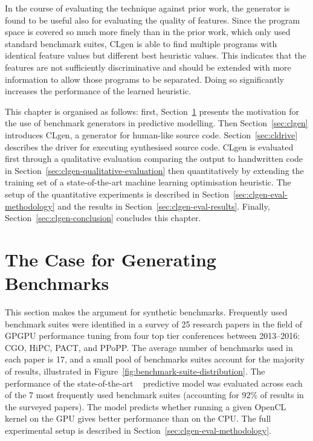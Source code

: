 In the course of evaluating the technique against prior work, the generator is found to be useful also for evaluating the quality of features. Since the program space is covered so much more finely than in the prior work, which only used standard benchmark suites, CLgen is able to find multiple programs with identical feature values but different best heuristic values. This indicates that the features are not sufficiently discriminative and should be extended with more information to allow those programs to be separated. Doing so significantly increases the performance of the learned heuristic.

This chapter is organised as follows: first, Section~\ref{sec:the-case-for-benchmark-generators} presents the motivation for the use of benchmark generators in predictive modelling. Then Section~\ref{sec:clgen} introduces CLgen, a generator for human-like source code. Section~\ref{sec:cldrive} describes the driver for executing synthesised source code. CLgen is evaluated first through a qualitative evaluation comparing the output to handwritten code in Section~\ref{sec:clgen-qualitative-evaluation} then quantitatively by extending the training set of a state-of-the-art machine learning optimisation heuristic. The setup of the quantitative experiments is described in Section~\ref{sec:clgen-eval-methodology} and the results in Section~\ref{sec:clgen-eval-results}. Finally, Section~\ref{sec:clgen-conclusion} concludes this chapter.


\section{The Case for Generating Benchmarks}%
\label{sec:the-case-for-benchmark-generators}

This section makes the argument for synthetic benchmarks. Frequently used benchmark suites were identified in a survey of 25 research papers in the field of GPGPU performance tuning from four top tier conferences between 2013--2016: CGO, HiPC, PACT, and PPoPP. The average number of benchmarks used in each paper is 17, and a small pool of benchmarks suites account for the majority of results, illustrated in Figure~\ref{fig:benchmark-suite-distribution}. The performance of the state-of-the-art \citeauthor{Grewe2013}~\cite{Grewe2013} predictive model was evaluated across each of the 7 most frequently used benchmark suites (accounting for 92\% of results in the surveyed papers). The model predicts whether running a given OpenCL kernel on the GPU gives better performance than on the CPU. The full experimental setup is described in Section~\ref{sec:clgen-eval-methodology}.

